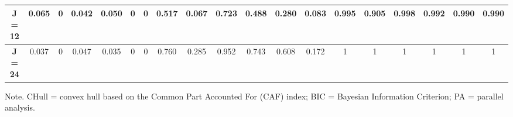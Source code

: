 \documentclass[a4paper,man,natbib]{apa6}
\begin{document}
\begin{linenumbers}
\begin{table}[]
{\begin{tabular}{ccccccccccccccccccc}
		\textbf{J = 12}      & 0.065 & 0 & 0.042 & 0.050 & 0 & 0 & 0.517 & 0.067 & 0.723 & 0.488 & 0.280 & 0.083 & 0.995 & 0.905 & 0.998 & 0.992 & 0.990 & 0.990 \\ \hline
		\textbf{J = 24}      & 0.037 & 0 & 0.047 & 0.035 & 0 & 0 & 0.760 & 0.285 & 0.952 & 0.743 & 0.608 & 0.172 & 1 & 1 & 1 & 1 & 1 & 1 \\ \hline
	\end{tabular}%
}
	\begin{tablenotes}[flushleft]
		\small
		\item 	Note. CHull = convex hull based on the Common Part Accounted For (CAF) index; BIC = Bayesian Information Criterion; PA = parallel analysis.
	\end{tablenotes}
	
\end{table}


\end{linenumbers}
\end{document}

